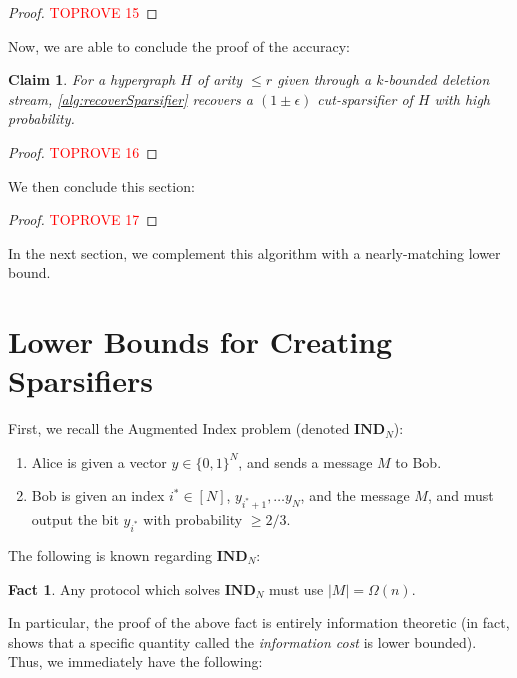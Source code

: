 \documentclass[11pt]{article}
\newtheorem{claim}[theorem]{Claim}
\theoremstyle{definition}
\newtheorem{fact}[theorem]{Fact}
\newcommand{\zo}{\{0, 1\}}
\newcommand{\eps}{\epsilon}
\begin{document}
\begin{proof}\textcolor{red}{TOPROVE 15}\end{proof}

Now, we are able to conclude the proof of the accuracy:

\begin{claim}\label{clm:accuracyBounded}
	For a hypergraph $H$ of arity $\leq r$ given through a $k$-bounded deletion stream, \cref{alg:recoverSparsifier} recovers a $(1 \pm \eps)$ cut-sparsifier of $H$ with high probability. 
\end{claim}

\begin{proof}\textcolor{red}{TOPROVE 16}\end{proof}

We then conclude this section:

\begin{proof}\textcolor{red}{TOPROVE 17}\end{proof}

In the next section, we complement this algorithm with a nearly-matching lower bound.

\section{Lower Bounds for Creating Sparsifiers}\label{sec:lowerbound}

First, we recall the Augmented Index problem (denoted $\textbf{IND}_N$):

\begin{enumerate}
    \item Alice is given a vector $y \in \zo^N$, and sends a message $M$ to Bob.
    \item Bob is given an index $i^* \in [N]$, $y_{i^* + 1}, \dots y_N$, and the message $M$, and must output the bit $y_{i^*}$ with probability $\geq 2/3$. 
\end{enumerate}

The following is known regarding $\textbf{IND}_N$:

\begin{fact}\cite{CK11}
    Any protocol which solves $\textbf{IND}_N$ must use $|M| = \Omega(n)$.
\end{fact}

In particular, the proof of the above fact is entirely information theoretic (in fact, \cite{CK11} shows that a specific quantity called the \emph{information cost} is lower bounded). Thus, we immediately have the following: 
\end{document}

